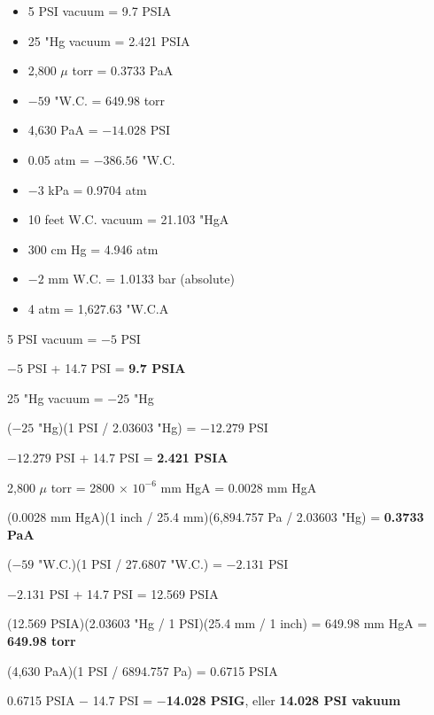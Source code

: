 
\begin{itemize}
\item{} 5 PSI vacuum = 9.7 PSIA
\vskip 5pt
\item{} 25 "Hg vacuum = 2.421 PSIA
\vskip 5pt
\item{} 2,800 $\mu$ torr = 0.3733 PaA
\vskip 5pt
\item{} $-59$ "W.C. = 649.98 torr
\vskip 5pt
\item{} 4,630 PaA = $-14.028$ PSI
\vskip 5pt
\item{} 0.05 atm = $-386.56$ "W.C.
\vskip 5pt
\item{} $-3$ kPa = 0.9704 atm
\vskip 5pt
\item{} 10 feet W.C. vacuum = 21.103 "HgA
\vskip 5pt
\item{} 300 cm Hg = 4.946 atm
\vskip 5pt
\item{} $-2$ mm W.C. = 1.0133 bar (absolute)
\vskip 5pt
\item{} 4 atm = 1,627.63 "W.C.A
\end{itemize}








5 PSI vacuum = $-5$ PSI

$-5$ PSI + 14.7 PSI = {\bf 9.7 PSIA}


\vskip 10pt


25 "Hg vacuum = $-25$ "Hg

($-25$ "Hg)(1 PSI / 2.03603 "Hg) = $-12.279$ PSI

$-12.279$ PSI + 14.7 PSI = {\bf 2.421 PSIA}


\vskip 10pt


2,800 $\mu$ torr = 2800 $\times$ $10^{-6}$ mm HgA = 0.0028 mm HgA

(0.0028 mm HgA)(1 inch / 25.4 mm)(6,894.757 Pa / 2.03603 "Hg) = {\bf 0.3733 PaA}


\vskip 10pt


($-59$ "W.C.)(1 PSI / 27.6807 "W.C.) = $-2.131$ PSI

$-2.131$ PSI + 14.7 PSI = 12.569 PSIA

(12.569 PSIA)(2.03603 "Hg / 1 PSI)(25.4 mm / 1 inch) = 649.98 mm HgA = {\bf 649.98 torr}


\vskip 10pt


(4,630 PaA)(1 PSI / 6894.757 Pa) = 0.6715 PSIA

0.6715 PSIA $-$ 14.7 PSI = {\bf $-$14.028 PSIG}, eller {\bf 14.028 PSI vakuum}


